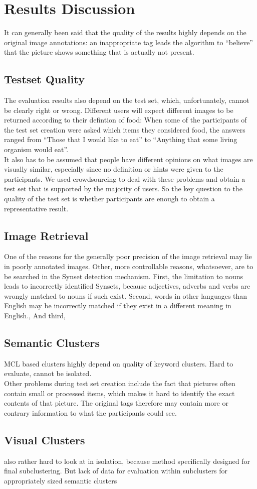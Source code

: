 %
\section{Results Discussion}
\label{sec_discussion}

It can generally been said that the quality of the results highly depends on the original image annotations: an inappropriate tag leads the algorithm to ``believe'' that the picture shows something that is actually not present.

\subsection{Testset Quality}
The evaluation results also depend on the test set, which, unfortunately, cannot be clearly right or wrong. Different users will expect different images to be returned according to their defintion of food: When some of the participants of the test set creation were asked which items they considered food, the answers ranged from ``Those that I would like to eat'' to ``Anything that some living organism would eat''. \\
It also has to be assumed that people have different opinions on what images are visually similar, especially since no definition or hints were given to the participants. We used crowdsourcing to deal with these problems and obtain a test set that is supported by the majority of users. So the key question to the quality of the test set is whether  participants are enough to obtain a representative result.

\subsection{Image Retrieval}
One of the reasons for the generally poor precision of the image retrieval may lie in poorly annotated images.
Other, more controllable reasons, whatsoever, are to be searched in the Synset detection mechanism. First, the limitation to nouns leads to incorrectly identified Synsets, because adjectives, adverbs and verbs are wrongly matched to nouns if such exist. 
Second, words in other languages than English may be incorrectly matched if they exist in a different meaning in English.,
And third, 


\subsection{Semantic Clusters}
MCL based clusters highly depend on quality of keyword clusters. Hard to evaluate, cannot be isolated.\\
Other problems during test set creation include the fact that pictures often contain small or processed items, which makes it hard to identify the exact contents of that picture. The original tags therefore may contain more or contrary information to what the participants could see. 

\subsection{Visual Clusters}
also rather hard to look at in isolation, because method specifically designed for final subclustering. But lack of data for evaluation within subclusters for appropriately sized semantic clusters